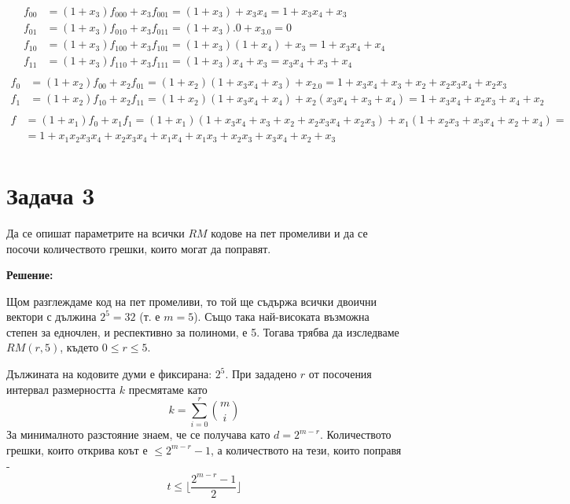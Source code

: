 \documentclass[11pt, oneside]{article}   	%
\begin{document}
\begin{align*}
    f_{00} &= (1 + x_3)f_{000} + x_3f_{001} = (1 + x_3) + x_3x_4 = 1 + x_3x_4 + x_3 \\
    f_{01} &= (1 + x_3)f_{010} + x_3f_{011} = (1 + x_3).0 + x_3.0 = 0 \\
    f_{10} &= (1 + x_3)f_{100} + x_3f_{101} = (1 + x_3)(1 + x_4) + x_3 = 1 + x_3x_4 + x_4 \\
    f_{11} &= (1 + x_3)f_{110} + x_3f_{111} = (1 + x_3)x_4 + x_3 = x_3x_4 + x_3 + x_4 \\
\end{align*}
\vspace{-7ex}
\begin{align*}
    f_0 &= (1 + x_2)f_{00} + x_2f_{01} = (1 + x_2)(1 + x_3x_4 + x_3) + x_2.0 = 1 + x_3x_4 + x_3 + x_2 + x_2x_3x_4 + x_2x_3 \\
    f_1 &= (1 + x_2)f_{10} + x_2f_{11} = (1 + x_2)(1 + x_3x_4 + x_4) + x_2(x_3x_4 + x_3 + x_4) = 1 + x_3x_4 + x_2x_3 + x_4 + x_2 \\
\end{align*}
\vspace{-7ex}
\begin{align*}
    f &= (1 + x_1)f_0 + x_1f_1 = (1 + x_1)(1 + x_3x_4 + x_3 + x_2 + x_2x_3x_4 + x_2x_3) + x_1(1 + x_2x_3 + x_3x_4 + x_2 + x_4) = \\
    &= 1 + x_1x_2x_3x_4 + x_2x_3x_4 + x_1x_4 + x_1x_3 + x_2x_3 + x_3x_4 + x_2 + x_3 \\
\end{align*}

\section*{Задача 3}
Да се опишат параметрите на всички $RM$ кодове на пет промеливи и да се посочи количеството грешки, които могат да поправят.

\textbf{Решение:}

Щом разглеждаме код на пет промеливи, то той ще съдържа всички двоични вектори с дължина $2^5 = 32$ (т. е $m = 5$). Също така най-високата възможна степен за едночлен, и респективно за полиноми, е 5. Тогава трябва да изследваме $RM(r, 5)$, където $0 \leq r \leq 5$.

Дължината на кодовите думи е фиксирана: $2^5$. При зададено $r$ от посочения интервал размерността $k$ пресмятаме като
\[
    k = \sum_{i=0}^{r} \binom{m}{i}
\]
За минималното разстояние знаем, че се получава като $d = 2^{m - r}$. Количеството грешки, които открива коът е $ \leq 2^{m-r} - 1$, а количеството на тези, които поправя - \[
t \leq \lfloor \frac{2^{m-r}-1}{2} \rfloor
\]
\end{document}
